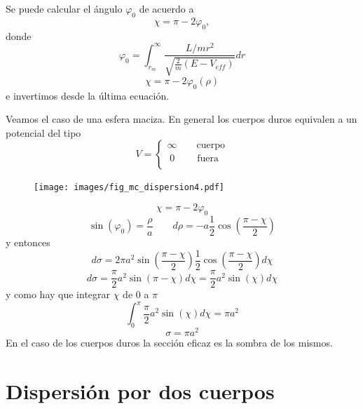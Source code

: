 \documentclass[10pt,oneside]{CBFT_book}
\begin{document}
Se puede calcular el ángulo $\varphi_0$ de acuerdo a 
\[
	\chi = \pi - 2\varphi_0,
\]
donde
\[
	\varphi_0 = \int_{r_m}^{\infty} \frac{L/mr^2}{\sqrt{\frac{2}{m}(E - V_{eff})}} dr
\]
\[
	\chi = \pi - 2 \varphi_0 (\rho)
\]
e invertimos desde la última ecuación.

Veamos el caso de una esfera maciza. En general los cuerpos duros equivalen a un potencial del tipo
\[
	V = \begin{cases}
	     \infty \qquad \textrm{cuerpo}\\
	     \;0 \qquad \; \textrm{fuera} \\
	    \end{cases}
\]
\begin{figure}[htb]
	\begin{center}
	\texttt{[image: images/fig\_mc\_dispersion4.pdf]}	 
	\end{center}
	\caption{}
\end{figure}
\[
	\chi = \pi - 2\varphi_0
\]
\[
	\sin(\varphi_0) = \frac{\rho}{a} \qquad d\rho = -a \frac{1}{2}\cos \left(\frac{\pi-\chi}{2}\right)
\]
y entonces 
\[
	d\sigma = 2\pi a^2 \sin\left(\frac{\pi-\chi}{2}\right) \frac{1}{2}\cos\left(\frac{\pi-\chi}{2}\right) d\chi
\]
\[
	d\sigma = \frac{\pi}{2} a^2 \sin( \pi-\chi) d\chi = \frac{\pi}{2} a^2 \sin( \chi) d\chi
\]
y como hay que integrar $\chi$ de 0 a $\pi$
\[
	\int_0^\pi \frac{\pi}{2} a^2 \sin( \chi) d\chi = \pi a^2
\]
\[
	\sigma = \pi a^2
\]
En el caso de los cuerpos duros la sección eficaz es la sombra de los mismos.


\section{Dispersión por dos cuerpos}
\end{document}
